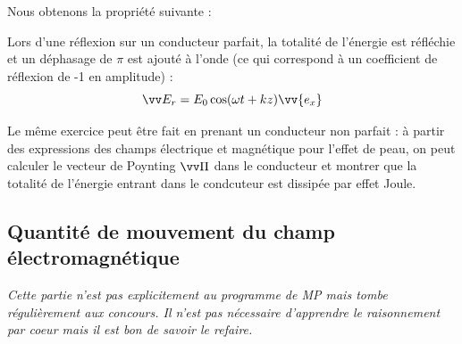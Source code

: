 \documentclass[11pt,fleqn]{book} %
\begin{document}
Nous obtenons la propriété suivante :
\begin{proposition}
	Lors d'une réflexion sur un conducteur parfait, la totalité de l'énergie est réfléchie et un déphasage de $\pi$ est ajouté à l'onde (ce qui correspond à un coefficient de réflexion de -1 en amplitude) :
	\begin{equation}
		\vv E_r = E_0 \cos(\omega t + k z) \vv{e_x}
	\end{equation}
\end{proposition}

\begin{remark}
	Le même exercice peut être fait en prenant un conducteur non parfait : à partir des expressions des champs électrique et magnétique pour l'effet de peau, on peut calculer le vecteur de Poynting $\vv \Pi$ dans le conducteur et montrer que la totalité de l'énergie entrant dans le condcuteur est dissipée par effet Joule.
\end{remark}

\subsection{Quantité de mouvement du champ électromagnétique}

\textit{Cette partie n'est pas explicitement au programme de MP mais tombe régulièrement aux concours. Il n'est pas nécessaire d'apprendre le raisonnement par coeur mais il est bon de savoir le refaire.}
\end{document}
